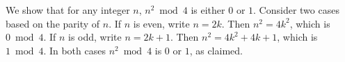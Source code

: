 We show that for any integer $n$, $n^2 \bmod 4$ is either $0$ or $1$.
Consider two cases based on the parity of $n$.
If $n$ is even, write $n = 2k$. Then $n^2 = 4k^2$, which is $0 \bmod 4$.
If $n$ is odd, write $n = 2k+1$. Then $n^2 = 4k^2 + 4k + 1$, which is $1 \bmod 4$.
In both cases $n^2 \bmod 4$ is $0$ or $1$, as claimed.

